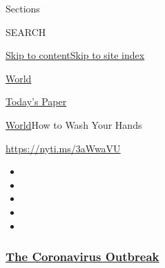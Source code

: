 Sections

SEARCH

\protect\hyperlink{site-content}{Skip to
content}\protect\hyperlink{site-index}{Skip to site index}

\href{https://www.nytimes3xbfgragh.onion/section/world}{World}

\href{https://myaccount.nytimes3xbfgragh.onion/auth/login?response_type=cookie\&client_id=vi}{}

\href{https://www.nytimes3xbfgragh.onion/section/todayspaper}{Today's
Paper}

\href{/section/world}{World}\textbar{}How to Wash Your Hands

\url{https://nyti.ms/3aWwaVU}

\begin{itemize}
\item
\item
\item
\item
\item
\end{itemize}

\hypertarget{the-coronavirus-outbreak}{%
\subsubsection{\texorpdfstring{\href{https://www.nytimes3xbfgragh.onion/news-event/coronavirus?name=styln-coronavirus-national\&region=TOP_BANNER\&block=storyline_menu_recirc\&action=click\&pgtype=Article\&impression_id=86727b20-f4bc-11ea-b51e-55332169c079\&variant=undefined}{The
Coronavirus
Outbreak}}{The Coronavirus Outbreak}}\label{the-coronavirus-outbreak}}

